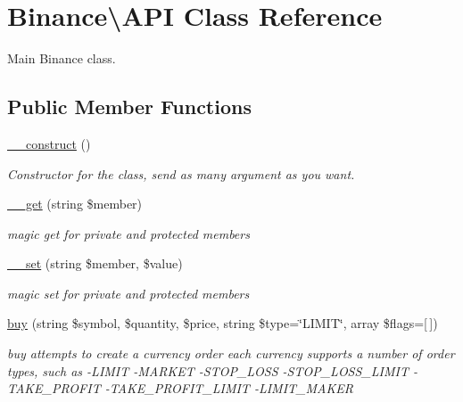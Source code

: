 \hypertarget{classBinance_1_1API}{\section{Binance\textbackslash{}A\-P\-I Class Reference}
\label{classBinance_1_1API}
}


Main Binance class.  


\subsection*{Public Member Functions}
\begin{DoxyCompactItemize}
\item 
\hyperlink{classBinance_1_1API_adbaefdc26d86ac1fd69ad101e0905c78}{\-\_\-\-\_\-construct} ()
\begin{DoxyCompactList}\small\item\em Constructor for the class, send as many argument as you want. \end{DoxyCompactList}\item 
\hyperlink{classBinance_1_1API_aa48130f98262fb73c42b90837a39ee9b}{\-\_\-\-\_\-get} (string \$member)
\begin{DoxyCompactList}\small\item\em magic get for private and protected members \end{DoxyCompactList}\item 
\hyperlink{classBinance_1_1API_a0c51e059d275539f7591ae1886787916}{\-\_\-\-\_\-set} (string \$member, \$value)
\begin{DoxyCompactList}\small\item\em magic set for private and protected members \end{DoxyCompactList}\item 
\hyperlink{classBinance_1_1API_a98bf564a5ff752a2393bc626b222905e}{buy} (string \$symbol, \$quantity, \$price, string \$type=\char`\"{}L\-I\-M\-I\-T\char`\"{}, array \$flags=\mbox{[}$\,$\mbox{]})
\begin{DoxyCompactList}\small\item\em buy attempts to create a currency order each currency supports a number of order types, such as -\/\-L\-I\-M\-I\-T -\/\-M\-A\-R\-K\-E\-T -\/\-S\-T\-O\-P\-\_\-\-L\-O\-S\-S -\/\-S\-T\-O\-P\-\_\-\-L\-O\-S\-S\-\_\-\-L\-I\-M\-I\-T -\/\-T\-A\-K\-E\-\_\-\-P\-R\-O\-F\-I\-T -\/\-T\-A\-K\-E\-\_\-\-P\-R\-O\-F\-I\-T\-\_\-\-L\-I\-M\-I\-T -\/\-L\-I\-M\-I\-T\-\_\-\-M\-A\-K\-E\-R \end{DoxyCompactList}\item 

\end{DoxyCompactItemize}

